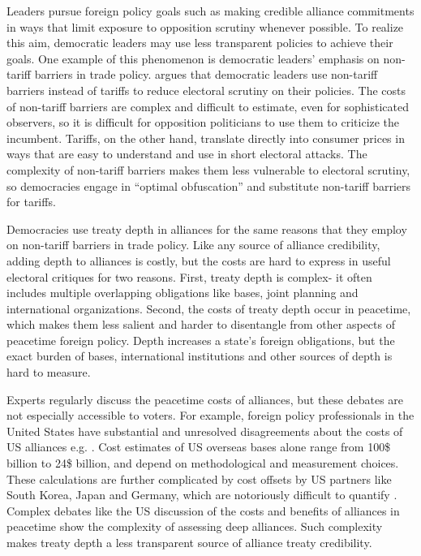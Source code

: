 \documentclass[12pt]{article}
\begin{document}
Leaders pursue foreign policy goals such as making credible alliance commitments in ways that limit exposure to opposition scrutiny whenever possible.
To realize this aim, democratic leaders may use less transparent policies to achieve their goals.  
One example of this phenomenon is democratic leaders' emphasis on non-tariff barriers in trade policy.
\citet{Kono2006} argues that democratic leaders use non-tariff barriers instead of tariffs to reduce electoral scrutiny on their policies.
The costs of non-tariff barriers are complex and difficult to estimate, even for sophisticated observers, so it is difficult for opposition politicians to use them to criticize the incumbent. 
Tariffs, on the other hand, translate directly into consumer prices in ways that are easy to understand and use in short electoral attacks.
The complexity of non-tariff barriers makes them less vulnerable to electoral scrutiny, so democracies engage in ``optimal obfuscation'' and substitute non-tariff barriers for tariffs. 


Democracies use treaty depth in alliances for the same reasons that they employ on non-tariff barriers in trade policy.
Like any source of alliance credibility, adding depth to alliances is costly, but the costs are hard to express in useful electoral critiques for two reasons.
First, treaty depth is complex- it often includes multiple overlapping obligations like bases, joint planning and international organizations.
Second, the costs of treaty depth occur in peacetime, which makes them less salient and harder to disentangle from other aspects of peacetime foreign policy. 
Depth increases a state's foreign obligations, but the exact burden of bases, international institutions and other sources of depth is hard to measure. 


Experts regularly discuss the peacetime costs of alliances, but these debates are not especially accessible to voters. 
For example, foreign policy professionals in the United States have substantial and unresolved disagreements about the costs of US alliances e.g. \citep{Brooksetal2013, Posen2014, BrandsFeaver2017}.
Cost estimates of US overseas bases alone range from 100\$ billion \citep{Vine2015} to 24\$ billion, and depend on methodological and measurement choices. 
These calculations are further complicated by cost offsets by US partners like South Korea, Japan and Germany, which are notoriously difficult to quantify \citep{Lostumboetal2013}.  
Complex debates like the US discussion of the costs and benefits of alliances in peacetime show the complexity of assessing deep alliances. 
Such complexity makes treaty depth a less transparent source of alliance treaty credibility. 
\end{document}
